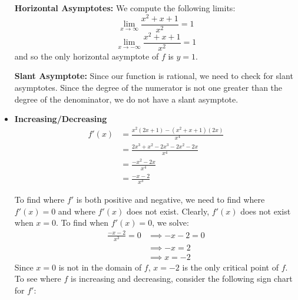 \documentclass[nooutcomes]{ximera}
\renewenvironment{freeResponse}{
\ifhandout\setbox0\vbox\bgroup\else
\begin{trivlist}\item[\hskip \labelsep\bfseries Solution:\hspace{2ex}]
\fi}
{\ifhandout\egroup\else
\end{trivlist}
\fi}
\newcommand{\dfn}{\textbf}
\begin{document}
\begin{problem}
\begin{freeResponse}
\begin{itemize}
       \dfn{Horizontal Asymptotes:}  We compute the following limits:
       \[
         \lim_{x \to \infty} \frac{x^2+x+1}{x^2} = 1
       \]
       \[
         \lim_{x \to -\infty} \frac{x^2+x+1}{x^2} = 1
       \]
       and so the only horizontal asymptote of $f$ is $y=1$.
			
       \dfn{Slant Asymptote:}  Since our function is rational, we need to check for slant asymptotes.
       Since the degree of the numerator is not one greater than the degree of the denominator, we do not have a slant asymptote.
			
     \item
       \dfn{Increasing/Decreasing}  \\

       \begin{align*}
         f'(x) &= \frac{x^2(2x+1) - (x^2+x+1)(2x)}{x^4} \\
               &= \frac{2x^3 + x^2 - 2x^3 - 2x^2 - 2x}{x^4} \\
               &= \frac{-x^2 - 2x}{x^4} \\
               &= \frac{-x-2}{x^3}
       \end{align*}
			
       To find where $f'$ is both positive and negative, we need to find where $f'(x) = 0$ and where $f'(x)$ does not exist.
       Clearly, $f'(x)$ does not exist when $x=0$.
       To find when $f'(x) = 0$, we solve:
       \begin{align*}
         \frac{-x-2}{x^3} = 0 &\implies -x-2 = 0 \\
         &\implies -x = 2\\
         &\implies x = -2
       \end{align*}
       Since $x=0$ is not in the domain of $f$, $x=-2$ is the only critical point of $f$.
       To see where $f$ is increasing and decreasing, consider the following sign chart for $f'$:
       \begin{center}
         \begin{image}
         \end{image}
       \end{center}


\end{itemize}
\end{freeResponse}
\end{problem}
\end{document}

